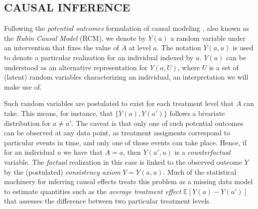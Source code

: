 \subsection{CAUSAL INFERENCE}

Following the \emph{potential outcomes} formulation of causal
modeling \cite{rubin:74}, also known as the \emph{Rubin Causal Model}
(RCM), we denote by $Y(a)$ a random variable under an intervention
that fixes the value of $A$ at level $a$. The notation $Y(a, u)$ is
used to denote a particular realization for an individual indexed by
$u$. $Y(a)$ can be understood as an alternative representation for
$Y(a, U)$, where $U$ is a set of (latent) random variables
characterizing an individual, an interpretation we will make use of.

Such random variables are postulated to exist for each treatment level
that $A$ can take. This means, for instance, that $\{Y(a), Y(a')\}$
follows a bivariate distribution for $a \neq a'$. The caveat is that
only one of such potential outcomes can be observed at any data point,
as treatment assigments correspond to particular events in time, and
only one of those events can take place. Hence, if for an individual
$u$ we have that $A = a$, then $Y(a', u)$ is a \emph{counterfactual}
variable. The \emph{factual} realization in this case is linked to the
observed outcome $Y$ by the (postulated) \emph{consistency axiom} $Y =
Y(a, u)$. Much of the statistical machinery for inferring causal
effects treats this problem as a missing data model \cite{imbens:15}
to estimate quantities such as the \emph{average treatment effect}
$\mathbb E[Y(a) - Y(a')]$ that assesses the difference between two
particular treatment levels.


